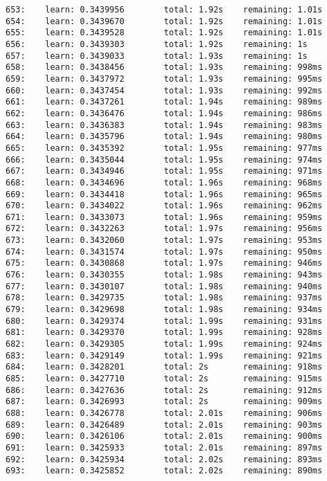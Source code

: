 \documentclass[11pt]{article}
\begin{document}
\begin{Verbatim}[commandchars=\\\{\}]
653:    learn: 0.3439956        total: 1.92s    remaining: 1.01s
654:    learn: 0.3439670        total: 1.92s    remaining: 1.01s
655:    learn: 0.3439528        total: 1.92s    remaining: 1.01s
656:    learn: 0.3439303        total: 1.92s    remaining: 1s
657:    learn: 0.3439033        total: 1.93s    remaining: 1s
658:    learn: 0.3438456        total: 1.93s    remaining: 998ms
659:    learn: 0.3437972        total: 1.93s    remaining: 995ms
660:    learn: 0.3437454        total: 1.93s    remaining: 992ms
661:    learn: 0.3437261        total: 1.94s    remaining: 989ms
662:    learn: 0.3436476        total: 1.94s    remaining: 986ms
663:    learn: 0.3436383        total: 1.94s    remaining: 983ms
664:    learn: 0.3435796        total: 1.94s    remaining: 980ms
665:    learn: 0.3435392        total: 1.95s    remaining: 977ms
666:    learn: 0.3435044        total: 1.95s    remaining: 974ms
667:    learn: 0.3434946        total: 1.95s    remaining: 971ms
668:    learn: 0.3434696        total: 1.96s    remaining: 968ms
669:    learn: 0.3434418        total: 1.96s    remaining: 965ms
670:    learn: 0.3434022        total: 1.96s    remaining: 962ms
671:    learn: 0.3433073        total: 1.96s    remaining: 959ms
672:    learn: 0.3432263        total: 1.97s    remaining: 956ms
673:    learn: 0.3432060        total: 1.97s    remaining: 953ms
674:    learn: 0.3431574        total: 1.97s    remaining: 950ms
675:    learn: 0.3430868        total: 1.97s    remaining: 946ms
676:    learn: 0.3430355        total: 1.98s    remaining: 943ms
677:    learn: 0.3430107        total: 1.98s    remaining: 940ms
678:    learn: 0.3429735        total: 1.98s    remaining: 937ms
679:    learn: 0.3429698        total: 1.98s    remaining: 934ms
680:    learn: 0.3429374        total: 1.99s    remaining: 931ms
681:    learn: 0.3429370        total: 1.99s    remaining: 928ms
682:    learn: 0.3429305        total: 1.99s    remaining: 924ms
683:    learn: 0.3429149        total: 1.99s    remaining: 921ms
684:    learn: 0.3428201        total: 2s       remaining: 918ms
685:    learn: 0.3427710        total: 2s       remaining: 915ms
686:    learn: 0.3427636        total: 2s       remaining: 912ms
687:    learn: 0.3426993        total: 2s       remaining: 909ms
688:    learn: 0.3426778        total: 2.01s    remaining: 906ms
689:    learn: 0.3426489        total: 2.01s    remaining: 903ms
690:    learn: 0.3426106        total: 2.01s    remaining: 900ms
691:    learn: 0.3425933        total: 2.01s    remaining: 897ms
692:    learn: 0.3425934        total: 2.02s    remaining: 893ms
693:    learn: 0.3425852        total: 2.02s    remaining: 890ms

\end{Verbatim}
\end{document}
